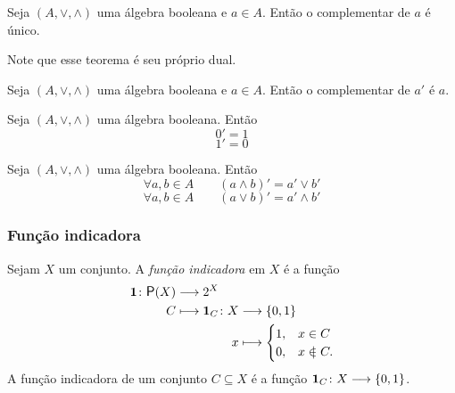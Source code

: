 \begin{theorem}
	Seja $(A, \vee ,\wedge)$ uma álgebra booleana e $a \in A$. Então o complementar de $a$ é único.
\end{theorem}

	Note que esse teorema é seu próprio dual.

\begin{theorem}
	Seja $(A, \vee ,\wedge)$ uma álgebra booleana e $a \in A$. Então o complementar de $a'$ é $a$.
\end{theorem}

\begin{theorem}
	Seja $(A, \vee ,\wedge)$ uma álgebra booleana. Então
	\begin{equation*}
	0'=1
	\end{equation*}
	\begin{equation*}
	1'=0
	\end{equation*}
\end{theorem}

\begin{theorem}
\label{prop:de.morgan}
	Seja $(A, \vee ,\wedge)$ uma álgebra booleana. Então
	\begin{equation*}
	\forall a,b \in A \qquad (a \wedge b)'=a' \vee b'
	\end{equation*}
	\begin{equation*}
	\forall a,b \in A \qquad (a  \vee  b)'=a' \wedge b'
	\end{equation*}
\end{theorem}

\subsubsection{Função indicadora}

\begin{definition}
Sejam $X$ um conjunto. A \emph{função indicadora} em $X$ é a função
	\begin{align*}
	\func{\idc}{\p(X)}{2^X}{C}{
		\begin{aligned}[t]
		\func{\idc_C}{X}{\{0,1\}}{x}{
			\begin{cases}
			1,& x \in C \\
			0,& x \notin C.
			\end{cases}
		}
		\end{aligned}
	}
	\end{align*}
A função indicadora de um conjunto $C \subseteq X$ é a função ${{\bm 1}_C}\colon {X} \longrightarrow {\{0,1\}}$.
\end{definition}


